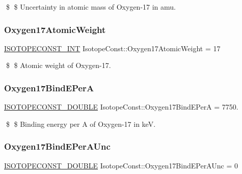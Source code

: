 \$ \$ Uncertainty in atomic mass of Oxygen-\/17 in amu. \mbox{\label{group___isotope_const-_oxygen-_o17_ga2fc69ee6c4214f6d9dd79f46879ff6b5}} 
\subsubsection{\texorpdfstring{Oxygen17\+Atomic\+Weight}{Oxygen17AtomicWeight}}
{\footnotesize\ttfamily \mbox{\hyperlink{group___isotope_const-_macros_ga5f18360b3e99483a35c32d789e62621c}{I\+S\+O\+T\+O\+P\+E\+C\+O\+N\+S\+T\+\_\+\+I\+NT}} Isotope\+Const\+::\+Oxygen17\+Atomic\+Weight = 17}

\$ \$ Atomic weight of Oxygen-\/17. \mbox{\label{group___isotope_const-_oxygen-_o17_ga20e6ad05eec7debc00d7894dc0f01c96}} 
\subsubsection{\texorpdfstring{Oxygen17\+Bind\+E\+PerA}{Oxygen17BindEPerA}}
{\footnotesize\ttfamily \mbox{\hyperlink{group___isotope_const-_macros_ga8f45a7272ce02c0b4c65c44636ed719a}{I\+S\+O\+T\+O\+P\+E\+C\+O\+N\+S\+T\+\_\+\+D\+O\+U\+B\+LE}} Isotope\+Const\+::\+Oxygen17\+Bind\+E\+PerA = 7750.}

\$ \$ Binding energy per A of Oxygen-\/17 in keV. \mbox{\label{group___isotope_const-_oxygen-_o17_gae81faae5ce52115baa6297404d7d0a26}} 
\subsubsection{\texorpdfstring{Oxygen17\+Bind\+E\+Per\+A\+Unc}{Oxygen17BindEPerAUnc}}
{\footnotesize\ttfamily \mbox{\hyperlink{group___isotope_const-_macros_ga8f45a7272ce02c0b4c65c44636ed719a}{I\+S\+O\+T\+O\+P\+E\+C\+O\+N\+S\+T\+\_\+\+D\+O\+U\+B\+LE}} Isotope\+Const\+::\+Oxygen17\+Bind\+E\+Per\+A\+Unc = 0}

